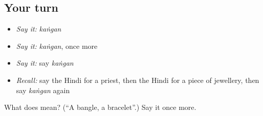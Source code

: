 \subsection*{Your turn}
\begin{itemize}
\raggedright
  \item \emph{Say it:} \emph{kaṅgan}
  \item \emph{Say it:} \emph{kaṅgan}, once more
  \item \emph{Say it:} say \emph{kaṅgan}
  \item \emph{Recall:} say the Hindi for a priest, then the Hindi for a piece of jewellery, then say \emph{kaṅgan} again
\end{itemize}

\begin{tcolorbox}[breakable,colback=teal!4,colframe=teal!35!black,title={Before you move on}]
What does  mean? (\textquotedblleft{}A bangle, a bracelet\textquotedblright{}.) Say it once more.
\end{tcolorbox}
